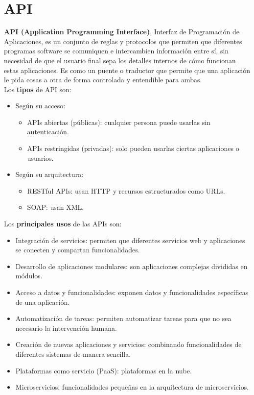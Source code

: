 \documentclass[10pt]{book}
\begin{document}
\section{API}
    \textbf{API (Application Programming Interface)}, Interfaz de Programación de Aplicaciones, es un conjunto de reglas y protocolos que permiten que diferentes programas software se comuniquen e intercambien información entre sí, sin necesidad de que el usuario final sepa los detalles internos de cómo funcionan estas aplicaciones. Es como un puente o traductor que permite que una aplicación le pida cosas a otra de forma controlada y entendible para ambas.\\
    Los \textbf{tipos} de API son:
        \begin{itemize}
            \item Según su acceso:
            \begin{itemize}
                \item APIs abiertas (públicas): cualquier persona puede usarlas sin autenticación.
                \item APIs restringidas (privadas): solo pueden usarlas ciertas aplicaciones o usuarios.
            \end{itemize}
            \item Según su arquitectura:
            \begin{itemize}
                \item RESTful APIs: usan HTTP y recursos estructurados como URLs.
                \item SOAP: usan XML.
            \end{itemize}
        \end{itemize}
    Los \textbf{principales usos} de las APIs son:
        \begin{itemize}
            \item Integración de servicios: permiten que diferentes servicios web y aplicaciones se conecten y compartan funcionalidades.
            \item Desarrollo de aplicaciones modulares: son aplicaciones complejas divididas en módulos.
            \item Acceso a datos y funcionalidades: exponen datos y funcionalidades específicas de una aplicación.
            \item Automatización de tareas: permiten automatizar tareas para que no sea necesario la intervención humana.
            \item Creación de nuevas aplicaciones y servicios: combinando funcionalidades de diferentes sistemas de manera sencilla.
            \item Plataformas como servicio (PaaS): plataformas en la nube.
            \item Microservicios: funcionalidades pequeñas en la arquitectura de microservicios.
        \end{itemize}
\end{document}
